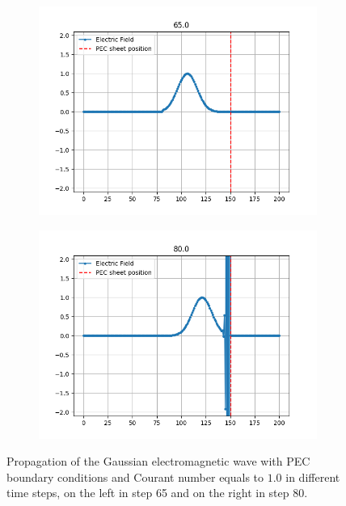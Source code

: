 \documentclass[12pt, oneside]{book}
\begin{document}
\begin{figure}[h!]
    \centering
    \begin{subfigure}[b]{0.49\textwidth}
        \centering
        \includegraphics[width=\textwidth]{Imagenes/CFDTD1D_Inestibility1.png}
    \end{subfigure}
    \begin{subfigure}[b]{0.49\textwidth}
        \centering
        \includegraphics[width=\textwidth]{Imagenes/CFDTD1D_Inestibility2.png}
    \end{subfigure}
    \caption{Propagation of the Gaussian electromagnetic wave with PEC boundary conditions and Courant number equals to $1.0$ in different time steps, on the left in step 65 and on the right in step 80.}
    \label{fig:CFDTD1D_Inestability}
\end{figure}
\end{document}
